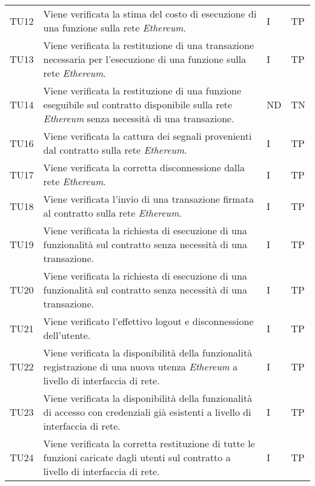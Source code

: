 \begin{longtable}{|C{1.5cm}|C{8cm}|C{3cm}|C{1cm}|}
	TU12 &
	Viene verificata la stima del costo di esecuzione di una funzione sulla rete \textit{Ethereum\glos}.  &
	I & TP\\

	TU13 &
	Viene verificata la restituzione di una transazione necessaria per l'esecuzione di una funzione sulla rete \textit{Ethereum\glo}.  &
	I & TP\\

	TU14 &
	Viene verificata la restituzione di una funzione eseguibile sul contratto disponibile sulla rete \textit{Ethereum\glo} senza necessità di una transazione.  &
	ND & TN \\

	TU16 &
	Viene verificata la cattura dei segnali provenienti dal contratto sulla rete \textit{Ethereum\glos}.  &
	I & TP\\

	TU17 &
	Viene verificata la corretta disconnessione dalla rete \textit{Ethereum\glos}.  &
	I & TP\\

	TU18 &
	Viene verificata l'invio di una transazione firmata al contratto sulla rete \textit{Ethereum\glos}.  &
	I & TP\\

	TU19 &
	Viene verificata la richiesta di esecuzione di una funzionalità sul contratto senza necessità di una transazione.  &
	I & TP\\

	TU20 &
	Viene verificata la richiesta di esecuzione di una funzionalità sul contratto senza necessità di una transazione.  &
	I & TP\\

	TU21 &
	Viene verificato l'effettivo logout e disconnessione dell'utente.  &
	I & TP\\

	TU22 &
	Viene verificata la disponibilità della funzionalità registrazione di una nuova utenza \textit{Ethereum\glo} a livello di interfaccia di rete.  &
	I & TP\\

	TU23 &
	Viene verificata la disponibilità della funzionalità di accesso con credenziali già esistenti a livello di interfaccia di rete.  &
	I & TP\\

	TU24 &
	Viene verificata la corretta restituzione di tutte le funzioni caricate dagli utenti sul contratto a livello di interfaccia di rete.  &
	I & TP\\


\end{longtable}
